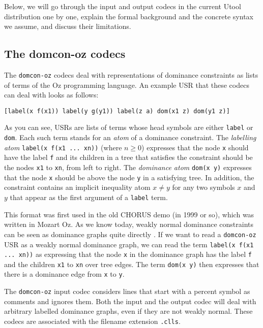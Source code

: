 Below, we will go through the input and output codecs in the current
Utool distribution one by one, explain the formal background and the
concrete syntax we assume, and discuss their limitations.



\subsection{The domcon-oz codecs}

The \verb?domcon-oz? codecs deal with representations of dominance
constraints \cite{clls2000} as lists of terms of the Oz programming
language. An example USR that these codecs can deal with looks as
follows:

\begin{verbatim}
[label(x f(x1)) label(y g(y1)) label(z a) dom(x1 z) dom(y1 z)]
\end{verbatim}

As you can see, USRs are lists of terms whose head symbols are either
\verb?label? or \verb?dom?. Each such term stands for an \emph{atom}
of a dominance constraint. The \emph{labelling atom}
\verb?label(x f(x1 ... xn))?  (where $n \geq 0$) expresses that the
node \verb?x? should have the label \verb?f? and its children in a
tree that satisfies the constraint should be the nodes \verb?x1? to
\verb?xn?, from left to right. The \emph{dominance atom}
\verb?dom(x y)? expresses that the node \verb?x? should be above the
node \verb?y? in a satisfying tree. In addition, the constraint
contains an implicit inequality atom $x \neq y$ for any two symbols
$x$ and $y$ that appear as the first argument of a \verb?label? term.

This format was first used in the old CHORUS demo (in 1999 or so),
which was written in Mozart Oz. As we know today, weakly normal
dominance constraints can be seen as dominance graphs quite directly
\cite{Koller04}. If we want to read a \verb?domcon-oz?  USR as a
weakly normal dominance graph, we can read the term
\verb?label(x f(x1 ... xn))? as expressing that the node \verb?x? in
the dominance graph has the label \verb?f? and the children \verb?x1?
to \verb?xn? over tree edges. The term \verb?dom(x y)? then expresses
that there is a dominance edge from \verb?x? to \verb?y?. 

The \verb?domcon-oz? input codec considers lines that start with a
percent symbol as comments and ignores them. Both the input and the
output codec will deal with arbitrary labelled dominance graphs, even
if they are not weakly normal. These codecs are associated with the
filename extension \verb?.clls?.



